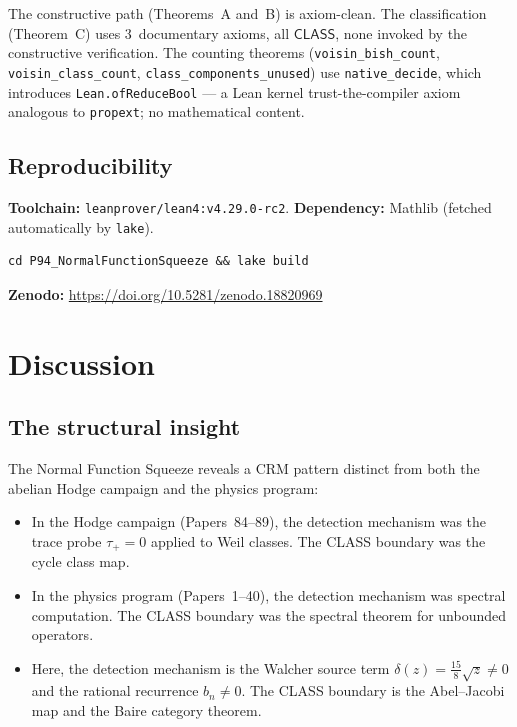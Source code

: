 \documentclass[11pt]{article}
\theoremstyle{plain}
\theoremstyle{definition}
\theoremstyle{remark}
\newcommand{\CLASS}{\ensuremath{\mathsf{CLASS}}}
\begin{document}
The constructive path (Theorems~A and~B) is axiom-clean. The classification (Theorem~C) uses $3$~documentary axioms, all $\CLASS$, none invoked by the constructive verification. The counting theorems (\texttt{voisin\_bish\_count}, \texttt{voisin\_class\_count}, \texttt{class\_components\_unused}) use \texttt{native\_decide}, which introduces \texttt{Lean.ofReduceBool} --- a Lean kernel trust-the-compiler axiom analogous to \texttt{propext}; no mathematical content.

\subsection{Reproducibility}

\textbf{Toolchain:} \texttt{leanprover/lean4:v4.29.0-rc2}.
\textbf{Dependency:} Mathlib (fetched automatically by \texttt{lake}).

\begin{verbatim}
cd P94_NormalFunctionSqueeze && lake build
\end{verbatim}

\noindent
\textbf{Zenodo:} \url{https://doi.org/10.5281/zenodo.18820969}

\section{Discussion}
\label{sec:discussion}

\subsection{The structural insight}

The Normal Function Squeeze reveals a CRM pattern distinct from both the abelian Hodge campaign and the physics program:
\begin{itemize}[nosep]
\item In the Hodge campaign (Papers~84--89), the detection mechanism was the trace probe $\tau_+ = 0$ applied to Weil classes. The CLASS boundary was the cycle class map.
\item In the physics program (Papers~1--40), the detection mechanism was spectral computation. The CLASS boundary was the spectral theorem for unbounded operators.
\item Here, the detection mechanism is the Walcher source term $\delta(z) = \tfrac{15}{8}\sqrt{z} \neq 0$ and the rational recurrence $b_n \neq 0$. The CLASS boundary is the Abel--Jacobi map and the Baire category theorem.
\end{itemize}
\end{document}

